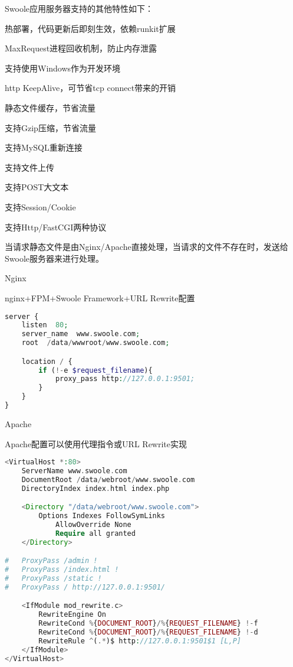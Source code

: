 Swoole应用服务器支持的其他特性如下：

\begin{compactitem}
\item 热部署，代码更新后即刻生效，依赖runkit扩展
\item MaxRequest进程回收机制，防止内存泄露
\item 支持使用Windows作为开发环境
\item http KeepAlive，可节省tcp connect带来的开销
\item 静态文件缓存，节省流量
\item 支持Gzip压缩，节省流量
\item 支持MySQL重新连接
\item 支持文件上传
\item 支持POST大文本
\item 支持Session/Cookie
\item 支持Http/FastCGI两种协议
\end{compactitem}

当请求静态文件是由Nginx/Apache直接处理，当请求的文件不存在时，发送给Swoole服务器来进行处理。


\begin{compactitem}

\item Nginx

\begin{example}
nginx+FPM+Swoole Framework+URL Rewrite配置
\begin{lstlisting}[language=PHP]
server {
    listen  80;
    server_name  www.swoole.com;
    root  /data/wwwroot/www.swoole.com;

    location / {
        if (!-e $request_filename){
            proxy_pass http://127.0.0.1:9501;
        }
    }
}
\end{lstlisting}
\end{example}

\item Apache

\begin{example}
Apache配置可以使用代理指令或URL Rewrite实现
\begin{lstlisting}[language=PHP]
<VirtualHost *:80>
    ServerName www.swoole.com
    DocumentRoot /data/webroot/www.swoole.com
    DirectoryIndex index.html index.php

    <Directory "/data/webroot/www.swoole.com">
        Options Indexes FollowSymLinks
            AllowOverride None
            Require all granted
    </Directory>

#   ProxyPass /admin !
#   ProxyPass /index.html !
#   ProxyPass /static !
#   ProxyPass / http://127.0.0.1:9501/

    <IfModule mod_rewrite.c>
        RewriteEngine On
        RewriteCond %{DOCUMENT_ROOT}/%{REQUEST_FILENAME} !-f
        RewriteCond %{DOCUMENT_ROOT}/%{REQUEST_FILENAME} !-d
        RewriteRule ^(.*)$ http://127.0.0.1:9501$1 [L,P]
    </IfModule>
</VirtualHost>
\end{lstlisting}
\end{example}

\end{compactitem}

